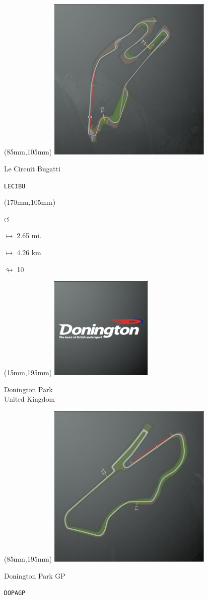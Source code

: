 \begin{textblock*}{80mm}(85mm,105mm)%
\includegraphics[width=80mm]{TR/2015-05-20_00032.png}
\centerline{Le Circuit Bugatti}
\par\hfill\tiny\tt LECIBU\\
\end{textblock*}
\begin{textblock*}{30mm}(170mm,105mm)%
\par \Huge$\circlearrowleft$
\Large
\par$\mapsto$ 2.65 mi.
\par$\mapsto$ 4.26 km
\par$\looparrowright$ 10
\end{textblock*}
\begin{textblock*}{60mm}(15mm,195mm)%
\includegraphics[width=50mm]{LG/2015-05-20_00080.png}
\par Donington Park\\ United Kingdom
\end{textblock*}
\begin{textblock*}{80mm}(85mm,195mm)%
\includegraphics[width=80mm]{TR/2015-05-20_00022.png}
\centerline{Donington Park GP}
\par\hfill\tiny\tt DOPAGP\\
\end{textblock*}
